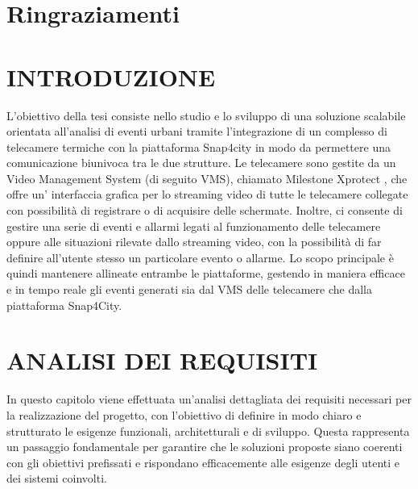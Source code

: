 \documentclass[a4paper, openright, thesis]{report}
\newcommand\blankpage{%
    \null
    \thispagestyle{empty}%
    \addtocounter{page}{-1}%
    \newpage}
\begin{document}
\afterpage{\blankpage}
\newpage





\chapter*{Ringraziamenti}

\tableofcontents

\afterpage{\blankpage}
\newpage

\setcounter{page}{1}


\chapter{INTRODUZIONE}

L’obiettivo della tesi consiste nello studio e lo sviluppo di una soluzione scalabile orientata all'analisi di eventi urbani tramite l'integrazione di un complesso di telecamere termiche con la
piattaforma Snap4city \cite{snap4city} in modo da permettere una comunicazione biunivoca tra le due strutture.
Le telecamere sono gestite da un Video Management System (di seguito VMS), chiamato Milestone
Xprotect \cite{milestoneVMS}, che offre un’ interfaccia grafica per lo streaming video di tutte le telecamere collegate
con possibilità di registrare o di acquisire delle schermate. Inoltre, ci consente di gestire una serie di eventi e allarmi legati al funzionamento delle
telecamere oppure alle situazioni rilevate dallo streaming video, con la possibilità di far definire all’utente stesso un particolare evento o allarme. Lo scopo principale è quindi mantenere allineate entrambe le piattaforme, gestendo in maniera efficace e in tempo reale gli eventi generati sia dal VMS delle telecamere che dalla piattaforma Snap4City.

\afterpage{\blankpage}

\chapter{ANALISI DEI REQUISITI}
In questo capitolo viene effettuata un’analisi dettagliata dei requisiti necessari per la realizzazione del progetto, con l’obiettivo di definire in modo chiaro e strutturato le esigenze funzionali, architetturali e di sviluppo. Questa rappresenta un passaggio fondamentale per garantire che le soluzioni proposte siano coerenti con gli obiettivi prefissati e rispondano efficacemente alle esigenze degli utenti e dei sistemi coinvolti.
\end{document}
